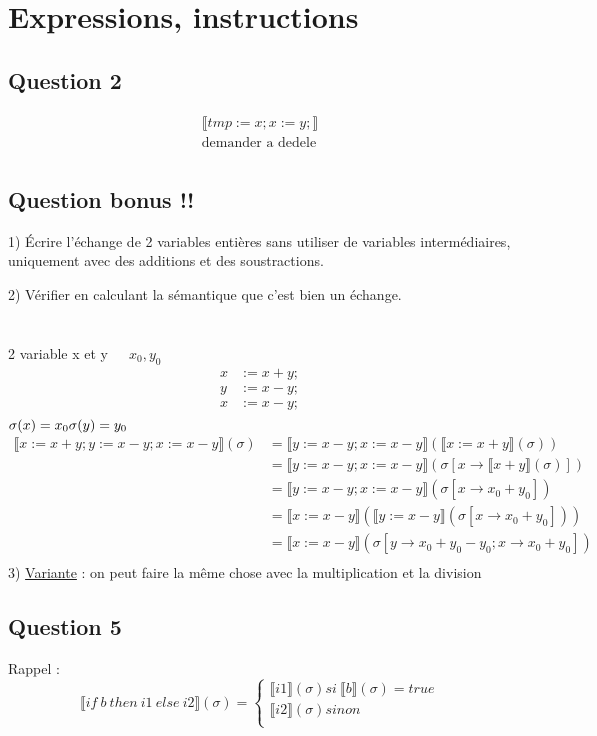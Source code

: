 \documentclass[11pt,a4paper]{article}
\newcommand{\llbr}{\llbracket}
\newcommand{\rrbr}{\rrbracket}
\begin{document}
	\section{Expressions, instructions}
	\subsection{Question 2}
	\begin{align*}
		  \llbr tmp := x; x := y;   \rrbr \\
		\text{demander a dedele}\\
	\end{align*}
	\subsection{Question bonus !!}
	1) Écrire l'échange de 2 variables entières sans utiliser de variables intermédiaires, uniquement avec des additions et des soustractions.
	
	2) Vérifier en calculant la sémantique que c'est bien un échange.
	\\\\\\
	2 variable x et y\ \ \   $x_{0}, y_{0}$
	\begin{align*}
		x &:= x + y;\\
		y &:= x - y;\\
		x &:= x - y;\\
	\end{align*}
	$\sigma(x) = x_{0} \\ \sigma(y) = y_{0}$
	\begin{align*}
		  \llbr x := x + y; y := x - y; x := x - y  \rrbr (\sigma) &=   \llbr y := x - y; x := x - y  \rrbr (  \llbr x := x + y  \rrbr (\sigma))\\
		&=   \llbr y := x - y; x := x - y  \rrbr (\sigma[x \to   \llbr x + y  \rrbr (\sigma)])\\
		&=   \llbr y := x - y; x := x - y  \rrbr (\sigma[x \to x_{0} + y_{0}])\\
		&=   \llbr x := x - y  \rrbr (  \llbr y := x - y  \rrbr (\sigma[x \to x_{0} + y_{0}]))\\
		&=   \llbr x := x - y  \rrbr (\sigma[y \to x_{0} + y_{0} - y_{0}; x \to x_{0} + y_{0}])\\
	\end{align*}
	3) \underline{Variante} : on peut faire la même chose avec la multiplication et la division
	\newpage
	
	\subsection{Question 5}
	Rappel :\\
	\[
		  \llbr if\ b\ then\ i1\ else\ i2  \rrbr (\sigma) =
		\begin{cases}
			  \llbr i1  \rrbr (\sigma) si\   \llbr b  \rrbr (\sigma) = true\\
			  \llbr i2  \rrbr (\sigma) sinon\\
		\end{cases}
	\]
	
\end{document}
